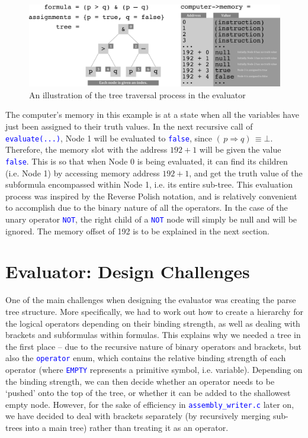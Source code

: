 \documentclass[11pt]{article}
\newcommand{\code}[1]{\mbox{\texttt{\textcolor{blue}{#1}}}}
\begin{document}
\begin{figure}[h]
\centering
\includegraphics[width=\linewidth]{evaluator_tree_traversal}
\caption{An illustration of the tree traversal process in the evaluator}
\label{fig:evaluator_tree_traversal}
\end{figure}

The computer's memory in this example is at a state when all the variables have just been assigned to their truth values. In the next recursive call of \code{evaluate(...)}, Node 1 will be evaluated to \code{false}, since \(( \,p \Rightarrow q) \, \equiv \bot\). Therefore, the memory slot with the address \(192 + 1\) will be given the value \code{false}. This is so that when Node 0 is being evaluated, it can find its children (i.e. Node 1) by accessing memory address \(192 + 1\), and get the truth value of the subformula encompassed within Node 1, i.e. its entire sub-tree. This evaluation process was inspired by the Reverse Polish notation, and is relatively convenient to accomplish due to the binary nature of all the operators. In the case of the unary operator \code{NOT}, the right child of a \code{NOT} node will simply be null and will be ignored. The memory offset of 192 is to be explained in the next section.

\section{Evaluator: Design Challenges}

One of the main challenges when designing the evaluator was creating the parse tree structure. More specifically, we had to work out how to create a hierarchy for the logical operators depending on their binding strength, as well as dealing with brackets and subformulas within formulas. This explains why we needed a tree in the first place – due to the recursive nature of binary operators and brackets, but also the \code{operator} enum, which contains the relative binding strength of each operator (where \code{EMPTY} represents a primitive symbol, i.e. variable). Depending on the binding strength, we can then decide whether an operator needs to be `pushed' onto the top of the tree, or whether it can be added to the shallowest empty node. However, for the sake of efficiency in \code{assembly\_writer.c} later on, we have decided to deal with brackets separately (by recursively merging sub-trees into a main tree) rather than treating it as an operator.\\
\end{document}
